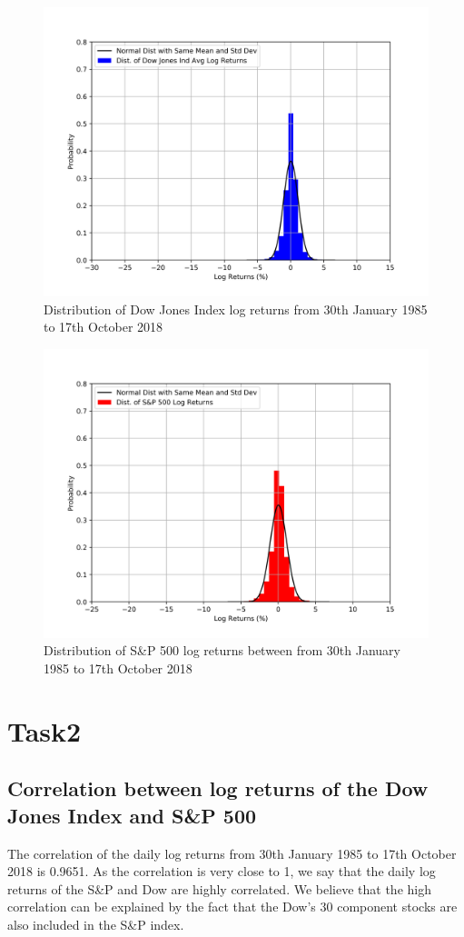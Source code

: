 \documentclass[a4paper]{article}
\begin{document}
	\newpage	
	\begin{figure}[h!]
		\centering
		\includegraphics[width=0.8\linewidth]{DJInorm.png}
		\caption{Distribution of Dow Jones Index log returns from 30th January 1985 to 17th October 2018}
	\end{figure}
	\begin{figure}[h!]
		\centering
		\includegraphics[width=0.8\linewidth]{GSPCnorm.png}
		\caption{Distribution of S\&P 500 log returns between from 30th January 1985 to 17th October 2018}
	\end{figure}
	
	\newpage
	\section{Task2}
	\label{sec:introduction}
	
	\subsection{Correlation between log returns of the Dow Jones Index and S\&P 500}
	The correlation of the daily log returns from 30th January 1985 to 17th October 2018 is 0.9651. As the correlation is very close to 1, we say that the daily log returns of the S\&P and Dow are highly correlated. We believe that the high correlation can be explained by the fact that the Dow’s 30 component stocks are also included in the S\&P index. 
	
\end{document}
